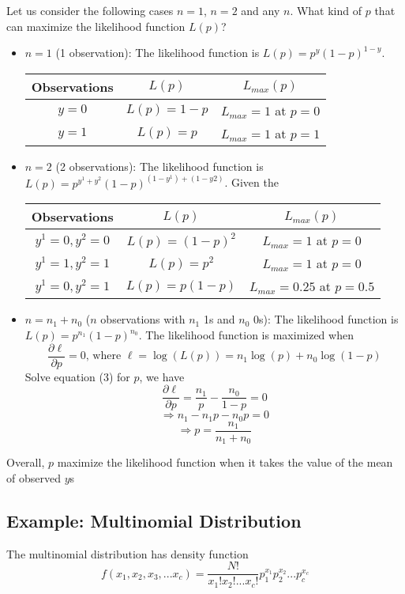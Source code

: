 \documentclass[12pt, oneside]{article}
\begin{document}
Let us consider the following cases $n=1$, $n=2$ and any $n$. What kind of $p$ that can maximize the likelihood function $L(p)$?
\begin{itemize}
\item $n=1$ (1 observation): The likelihood function is $L(p)=p^{y}(1-p)^{1-y}$. 
\begin{center}
\begin{tabular}{c|c|c} 
Observations & $L(p)$ &$ L_{max}(p)$\\
\hline
$y=0$ & $L(p)=1-p$ &$L_{max}=1$ at $p=0$\\
$y=1$ & $L(p)=p$     &$L_{max}=1$ at $p=1$\\
\end{tabular}
\end{center}
\item $n=2$ (2 observations): The likelihood function is $L(p)=p^{y^1+y^2}(1-p)^{(1-y^1)+(1-y2)}$. Given the 
\begin{center}
\begin{tabular}{c|c|c} 
Observations & $L(p)$ &$ L_{max}(p)$\\
\hline
$y^1=0, y^2=0$ & $L(p)=(1-p)^2$ &$L_{max}=1$ at $p=0$\\
$y^1=1, y^2=1$ & $L(p)=p^2$     &$L_{max}=1$ at $p=0$\\
$y^1=0, y^2=1$ & $L(p)=p(1-p)$  &$L_{max}=0.25$ at $p=0.5$
\end{tabular}
\end{center}
\item $n=n_1+n_0$ ($n$ observations with $n_1$ 1s and $n_0$ 0s): The likelihood function is $L(p)=p^{n_1}(1-p)^{n_0}$. The likelihood function is maximized when 
\begin{equation}
\frac{\partial \ell}{\partial p}=0 \text{, where }\ell=\log(L(p))=n_1 \log(p)+n_0 \log(1-p)
\end{equation}
Solve equation (3) for $p$, we have 
$$\frac{\partial \ell}{\partial p}=\frac{n_1}{p}-\frac{n_0}{1-p}=0$$
$$\Rightarrow n_1-n_1 p-n_0 p=0$$
$$\Rightarrow p=\frac{n_1}{n_1+n_0}$$
\end{itemize}

Overall, $p$ maximize the likelihood function when it takes the value of the mean of observed $y$s
\subsection{Example: Multinomial Distribution}

The multinomial distribution has density function
$${f(x_1, x_2, x_3, ... x_c)=\frac{N!}{x_1! x_2! ... x_c!} p_1^{x_1} p_2^{x_2} ... p_c^{x_c}}$$
\end{document}

